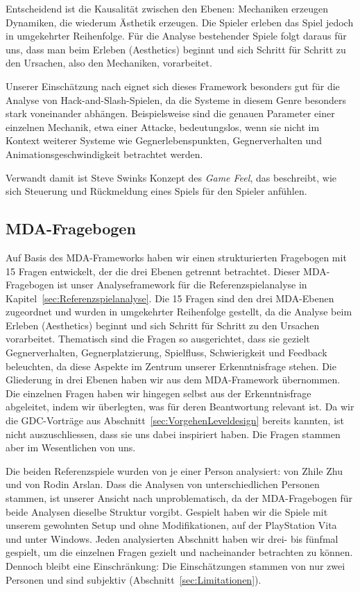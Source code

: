 \documentclass[../Main.tex]{subfiles}
\begin{document}
Entscheidend ist die Kausalität zwischen den Ebenen: Mechaniken erzeugen Dynamiken, die wiederum Ästhetik erzeugen. Die Spieler erleben das Spiel jedoch in umgekehrter Reihenfolge.\autocite[2]{hunicke2004mda} Für die Analyse bestehender Spiele folgt daraus für uns, dass man beim Erleben (Aesthetics) beginnt und sich Schritt für Schritt zu den Ursachen, also den Mechaniken, vorarbeitet.

Unserer Einschätzung nach eignet sich dieses Framework besonders gut für die Analyse von Hack-and-Slash-Spielen, da die Systeme in diesem Genre besonders stark voneinander abhängen. Beispielsweise sind die genauen Parameter einer einzelnen Mechanik, etwa einer Attacke, bedeutungslos, wenn sie nicht im Kontext weiterer Systeme wie Gegnerlebenspunkten, Gegnerverhalten und Animationsgeschwindigkeit betrachtet werden.

Verwandt damit ist Steve Swinks Konzept des \textit{Game Feel}, das beschreibt, wie sich Steuerung und Rückmeldung eines Spiels für den Spieler anfühlen.\autocite[1--6]{swink2008gamefeel}

\subsection{MDA-Fragebogen} \label{sec:Analysefragebogen}

Auf Basis des MDA-Frameworks haben wir einen strukturierten Fragebogen mit 15 Fragen entwickelt, der die drei Ebenen getrennt betrachtet. Dieser MDA-Fragebogen ist unser Analyseframework für die Referenzspielanalyse in Kapitel~\ref{sec:Referenzspielanalyse}. Die 15 Fragen sind den drei MDA-Ebenen zugeordnet und wurden in umgekehrter Reihenfolge gestellt, da die Analyse beim Erleben (Aesthetics) beginnt und sich Schritt für Schritt zu den Ursachen vorarbeitet. Thematisch sind die Fragen so ausgerichtet, dass sie gezielt Gegnerverhalten, Gegnerplatzierung, Spielfluss, Schwierigkeit und Feedback beleuchten, da diese Aspekte im Zentrum unserer Erkenntnisfrage stehen. Die Gliederung in drei Ebenen haben wir aus dem MDA-Framework übernommen.\autocite{hunicke2004mda} Die einzelnen Fragen haben wir hingegen selbst aus der Erkenntnisfrage abgeleitet, indem wir überlegten, was für deren Beantwortung relevant ist. Da wir die GDC-Vorträge aus Abschnitt~\ref{sec:VorgehenLeveldesign} bereits kannten, ist nicht auszuschliessen, dass sie uns dabei inspiriert haben. Die Fragen stammen aber im Wesentlichen von uns.

Die beiden Referenzspiele wurden von je einer Person analysiert:  von Zhile Zhu und  von Rodin Arslan. Dass die Analysen von unterschiedlichen Personen stammen, ist unserer Ansicht nach unproblematisch, da der MDA-Fragebogen für beide Analysen dieselbe Struktur vorgibt. Gespielt haben wir die Spiele mit unserem gewohnten Setup und ohne Modifikationen,  auf der PlayStation Vita und  unter Windows. Jeden analysierten Abschnitt haben wir drei- bis fünfmal gespielt, um die einzelnen Fragen gezielt und nacheinander betrachten zu können. Dennoch bleibt eine Einschränkung: Die Einschätzungen stammen von nur zwei Personen und sind subjektiv (Abschnitt~\ref{sec:Limitationen}).
\end{document}
